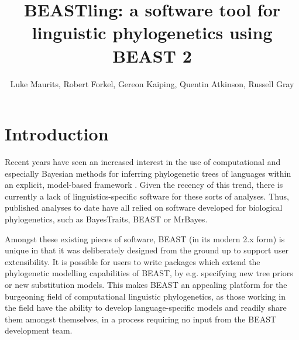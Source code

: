 \documentclass[twocolumn,10pt]{scrartcl}
\begin{document}
\title{BEASTling: a software tool for linguistic phylogenetics using BEAST 2}
\author{Luke Maurits, Robert Forkel, Gereon Kaiping, Quentin Atkinson, Russell Gray}
\maketitle

\section{Introduction}

Recent years have seen an increased interest in the use of computational and especially Bayesian methods for inferring phylogenetic trees of languages within an explicit, model-based framework \citep[e.g.,][]{Gray2003,Gray2009,Kitchen2009,Dunn2011a,Lee2011,Walker2011,Bouckaert2012,Bowern2012,Currie2013,Honkola2013,Sicoli2014,Grollemund2015,Chang2015}.  Given the recency of this trend, there is currently a lack of linguistics-specific software for these sorts of analyses.  Thus, published analyses to date have all relied on software developed for biological phylogenetics, such as BayesTraits\cite{Pagel2004}, BEAST\cite{Drummond2012,Bouckaert2014} or MrBayes\cite{Huelsenbeck2001, Ronquist2003}.

Amongst these existing pieces of software, BEAST (in its modern 2.x form) is unique in that it was deliberately designed from the ground up to support user extensibility.  It is possible for users to write packages which extend the phylogenetic modelling capabilities of BEAST, by e.g. specifying new tree priors or new substitution models.  This makes BEAST an appealing platform for the burgeoning field of computational linguistic phylogenetics, as those working in the field have the ability to develop language-specific models and readily share them amongst themselves, in a process requiring no input from the BEAST development team.
\end{document}
